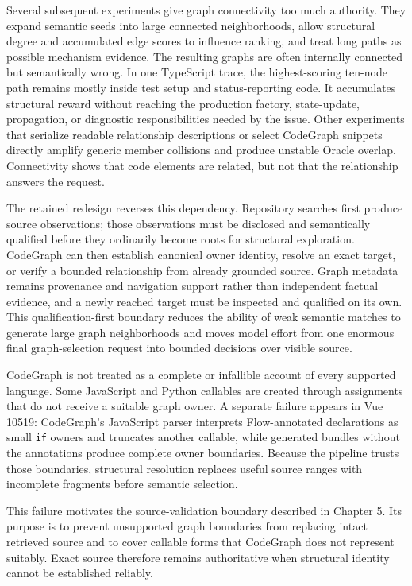 Several subsequent experiments give graph connectivity too much authority. They expand semantic seeds into large connected neighborhoods, allow structural degree and accumulated edge scores to influence ranking, and treat long paths as possible mechanism evidence. The resulting graphs are often internally connected but semantically wrong. In one TypeScript trace, the highest-scoring ten-node path remains mostly inside test setup and status-reporting code. It accumulates structural reward without reaching the production factory, state-update, propagation, or diagnostic responsibilities needed by the issue. Other experiments that serialize readable relationship descriptions or select CodeGraph snippets directly amplify generic member collisions and produce unstable Oracle overlap. Connectivity shows that code elements are related, but not that the relationship answers the request.

The retained redesign reverses this dependency. Repository searches first produce source observations; those observations must be disclosed and semantically qualified before they ordinarily become roots for structural exploration. CodeGraph can then establish canonical owner identity, resolve an exact target, or verify a bounded relationship from already grounded source. Graph metadata remains provenance and navigation support rather than independent factual evidence, and a newly reached target must be inspected and qualified on its own. This qualification-first boundary reduces the ability of weak semantic matches to generate large graph neighborhoods and moves model effort from one enormous final graph-selection request into bounded decisions over visible source.

CodeGraph is not treated as a complete or infallible account of every supported language. Some JavaScript and Python callables are created through assignments that do not receive a suitable graph owner. A separate failure appears in Vue 10519: CodeGraph's JavaScript parser interprets Flow-annotated declarations as small \texttt{if} owners and truncates another callable, while generated bundles without the annotations produce complete owner boundaries. Because the pipeline trusts those boundaries, structural resolution replaces useful source ranges with incomplete fragments before semantic selection.

This failure motivates the source-validation boundary described in Chapter 5. Its purpose is to prevent unsupported graph boundaries from replacing intact retrieved source and to cover callable forms that CodeGraph does not represent suitably. Exact source therefore remains authoritative when structural identity cannot be established reliably.

